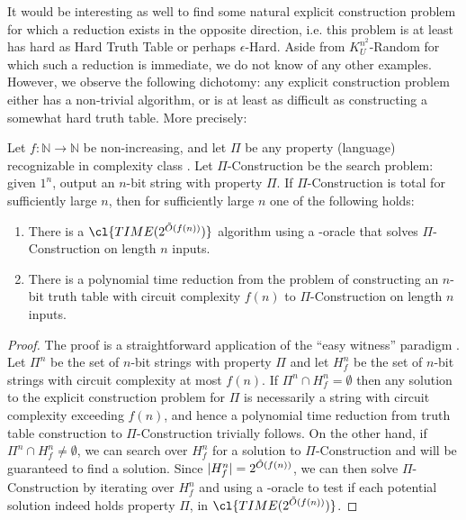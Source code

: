 It would be interesting as well to find some natural explicit construction problem for which a reduction exists in the opposite direction, i.e. this problem is at least has hard as {\sc Hard Truth Table} or perhaps {\sc $\epsilon$-Hard}. Aside from {\sc $K^{n^2}_U$-Random} for which such a reduction is immediate, we do not know of any other examples. However, we observe the following dichotomy: any explicit construction problem either has a non-trivial algorithm, or is at least as difficult as constructing a somewhat hard truth table. More precisely:
\begin{lemma}
Let $f: \mathbb{N} \rightarrow \mathbb{N}$ be non-increasing, and let $\Pi$ be any property (language) recognizable in complexity class . Let {\sc $\Pi$-Construction} be the search problem: given $1^n$, output an $n$-bit string with property $\Pi$. If {\sc $\Pi$-Construction} is total for sufficiently large $n$, then for sufficiently large $n$ one of the following holds:
\begin{enumerate}
    \item There is a $\cl{TIME(2^{\Tilde{O}(f(n))})}$ algorithm using a -oracle that solves {\sc $\Pi$-Construction} on length $n$ inputs.
    \item There is a polynomial time reduction from the problem of constructing an $n$-bit truth table with circuit complexity $f(n)$ to {\sc $\Pi$-Construction} on length $n$ inputs.
\end{enumerate}
\end{lemma}
\begin{proof}
The proof is a straightforward application of the ``easy witness'' paradigm \cite{easy-witness}. Let $\Pi^n$ be the set of $n$-bit strings with property $\Pi$ and let $H_f^n$ be the set of $n$-bit strings with circuit complexity at most $f(n)$. If $\Pi^n \cap H_f^n = \emptyset$ then any solution to the explicit construction problem for $\Pi$ is necessarily a string with circuit complexity exceeding $f(n)$, and hence a polynomial time reduction from truth table construction to {\sc $\Pi$-Construction} trivially follows. On the other hand, if $\Pi^n \cap H_f^n \neq \emptyset$, we can search over $H_f^n$ for a solution to {\sc $\Pi$-Construction} and will be guaranteed to find a solution. Since $|H_f^n| = 2^{\Tilde{O}(f(n))}$, we can then solve {\sc $\Pi$-Construction} by iterating over $H_f^n$ and using a -oracle to test if each potential solution indeed holds property $\Pi$, in $\cl{TIME(2^{\Tilde{O}(f(n))})}$.
\end{proof}

